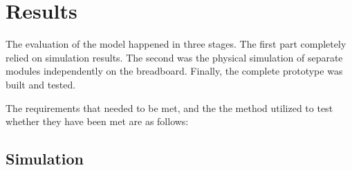 \section{Results}
The evaluation of the model happened in three stages. The first part completely relied on simulation results. The second was the physical simulation of separate modules independently on the breadboard. Finally, the complete prototype was built and tested.
\par
The requirements that needed to be met, and the
the method utilized to test whether they have been met
are as follows:

\begin{figure}[h]
\end{figure}
\subsection{Simulation}
